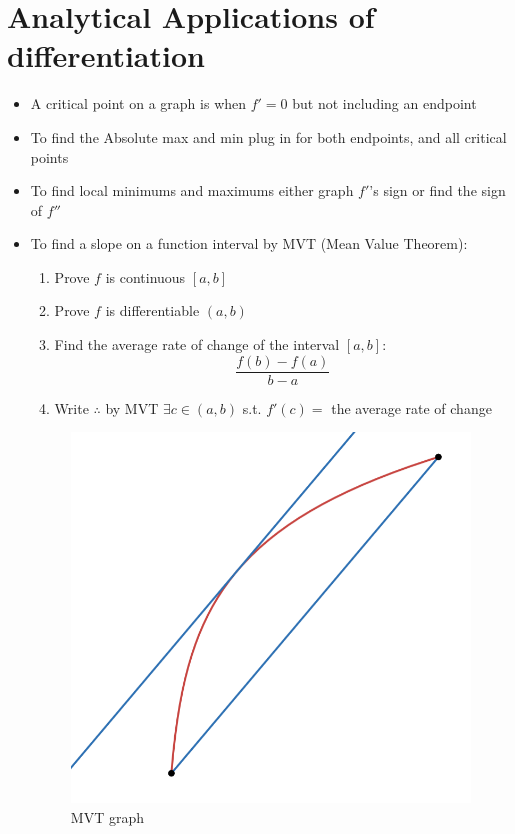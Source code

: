 \documentclass{article}
\begin{document}
\section{Analytical Applications of differentiation}
\begin{itemize}
    \item A critical point on a graph is when $f'=0$ but not including an endpoint
    \item To find the Absolute max and min plug in for both endpoints, and all critical points
    \item To find local minimums and maximums either graph $f'$'s sign or find the sign of $f''$
    \item To find a slope on a function interval by MVT (Mean Value Theorem):
    \begin{enumerate}
        \item Prove $f$ is continuous $[a,b]$
        \item Prove $f$ is differentiable $(a,b)$
        \item Find the average rate of change of the interval $[a,b]$:
        \[
            \frac{f(b)-f(a)}{b-a}
        \]
        \item Write $\therefore$ by MVT $\exists c\in(a,b)$ s.t. $f'(c) =$ the average rate of change
    \end{enumerate}

    \begin{figure}[H]
        \centering
        \includegraphics[width=0.5\linewidth]{images/MVT graph.png}
        \caption{MVT graph}
    \end{figure}
\end{itemize}

\newpage
\end{document}
